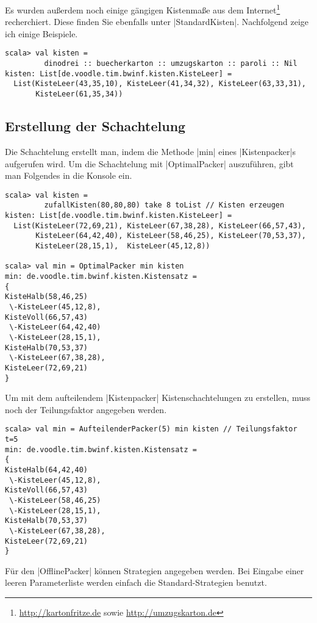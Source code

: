 Es wurden außerdem noch einige gängigen Kistenmaße aus dem Internet\footnote{\href{http://kartonfritze.de}{http://kartonfritze.de}
                                                                        sowie \href{http://umzugskarton.de}{http://umzugskarton.de}} recherchiert.
Diese finden Sie ebenfalls unter |StandardKisten|.
Nachfolgend zeige ich einige Beispiele.
\begin{lstlisting}
scala> val kisten =
         dinodrei :: buecherkarton :: umzugskarton :: paroli :: Nil
kisten: List[de.voodle.tim.bwinf.kisten.KisteLeer] =
  List(KisteLeer(43,35,10), KisteLeer(41,34,32), KisteLeer(63,33,31),
       KisteLeer(61,35,34))
\end{lstlisting}

\clearpage
\subsection{Erstellung der Schachtelung}
Die Schachtelung erstellt man, indem die Methode |min| eines |Kistenpacker|s aufgerufen wird.
Um die Schachtelung mit |OptimalPacker| auszuführen, gibt man Folgendes in die Konsole ein.
\label{demo_kisten}
\begin{lstlisting}
scala> val kisten =
         zufallKisten(80,80,80) take 8 toList // Kisten erzeugen
kisten: List[de.voodle.tim.bwinf.kisten.KisteLeer] =
  List(KisteLeer(72,69,21), KisteLeer(67,38,28), KisteLeer(66,57,43),
       KisteLeer(64,42,40), KisteLeer(58,46,25), KisteLeer(70,53,37),
       KisteLeer(28,15,1),  KisteLeer(45,12,8))

scala> val min = OptimalPacker min kisten
min: de.voodle.tim.bwinf.kisten.Kistensatz = 
{
KisteHalb(58,46,25)
 \-KisteLeer(45,12,8),
KisteVoll(66,57,43)
 \-KisteLeer(64,42,40)
 \-KisteLeer(28,15,1),
KisteHalb(70,53,37)
 \-KisteLeer(67,38,28),
KisteLeer(72,69,21)
}
\end{lstlisting}
Um mit dem aufteilendem |Kistenpacker| Kistenschachtelungen zu erstellen, muss noch der Teilungsfaktor angegeben werden.
\begin{lstlisting}
scala> val min = AufteilenderPacker(5) min kisten // Teilungsfaktor t=5
min: de.voodle.tim.bwinf.kisten.Kistensatz = 
{
KisteHalb(64,42,40)
 \-KisteLeer(45,12,8),
KisteVoll(66,57,43)
 \-KisteLeer(58,46,25)
 \-KisteLeer(28,15,1),
KisteHalb(70,53,37)
 \-KisteLeer(67,38,28),
KisteLeer(72,69,21)
}
\end{lstlisting}
\clearpage
Für den |OfflinePacker| können Strategien angegeben werden. Bei Eingabe einer leeren Parameterliste werden einfach die Standard-Strategien benutzt.
